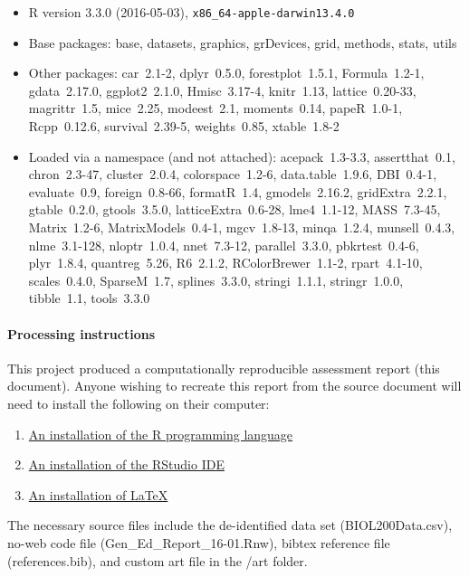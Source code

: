 \documentclass[fleqn,10pt]{SelfArx}\usepackage[]{graphicx}\usepackage[]{color}
\begin{document}
\begin{itemize}\raggedright
  \item R version 3.3.0 (2016-05-03), \verb|x86_64-apple-darwin13.4.0|
  \item Base packages: base, datasets, graphics, grDevices, grid,
    methods, stats, utils
  \item Other packages: car~2.1-2, dplyr~0.5.0, forestplot~1.5.1,
    Formula~1.2-1, gdata~2.17.0, ggplot2~2.1.0, Hmisc~3.17-4,
    knitr~1.13, lattice~0.20-33, magrittr~1.5, mice~2.25,
    modeest~2.1, moments~0.14, papeR~1.0-1, Rcpp~0.12.6,
    survival~2.39-5, weights~0.85, xtable~1.8-2
  \item Loaded via a namespace (and not attached):
    acepack~1.3-3.3, assertthat~0.1, chron~2.3-47, cluster~2.0.4,
    colorspace~1.2-6, data.table~1.9.6, DBI~0.4-1, evaluate~0.9,
    foreign~0.8-66, formatR~1.4, gmodels~2.16.2, gridExtra~2.2.1,
    gtable~0.2.0, gtools~3.5.0, latticeExtra~0.6-28, lme4~1.1-12,
    MASS~7.3-45, Matrix~1.2-6, MatrixModels~0.4-1, mgcv~1.8-13,
    minqa~1.2.4, munsell~0.4.3, nlme~3.1-128, nloptr~1.0.4,
    nnet~7.3-12, parallel~3.3.0, pbkrtest~0.4-6, plyr~1.8.4,
    quantreg~5.26, R6~2.1.2, RColorBrewer~1.1-2, rpart~4.1-10,
    scales~0.4.0, SparseM~1.7, splines~3.3.0, stringi~1.1.1,
    stringr~1.0.0, tibble~1.1, tools~3.3.0
\end{itemize}


\paragraph{Processing instructions}
This project produced a computationally reproducible assessment report (this document). Anyone wishing to recreate this report from the source document will need to install the following on their computer:
\begin{enumerate}
\item \href{https://www.r-project.org}{An installation of the R programming language}
\item \href{https://www.rstudio.com/products/rstudio/download3/}{ An installation of the RStudio IDE}
\item \href{https://www.latex-project.org/get/}{An installation of \LaTeX}
\end{enumerate}

The necessary source files include the de-identified data set (BIOL200Data.csv), no-web code file (Gen\_Ed\_Report\_16-01.Rnw), bibtex reference file (references.bib), and custom art file in the /art folder.
\end{document}
